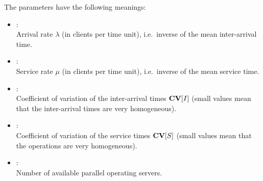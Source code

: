 The parameters have the following meanings:
\begin{itemize}
\item
{}:\\
Arrival rate $\lambda$ (in clients per time unit), i.e.\ inverse of the mean inter-arrival time.
\item
{}:\\
Service rate $\mu$ (in clients per time unit), i.e.\ inverse of the mean service time.
\item
{}:\\
Coefficient of variation of the inter-arrival times ${\bf CV}[I]$ (small values mean that the inter-arrival times are very homogeneous).
\item
{}:\\
Coefficient of variation of the service times ${\bf CV}[S]$ (small values mean that the operations are very homogeneous).
\item
{}:\\
Number of available parallel operating servers.
\end{itemize}